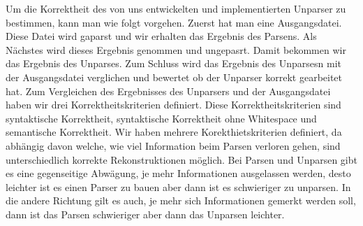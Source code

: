 Um die Korrektheit des von uns entwickelten und implementierten Unparser zu bestimmen, kann man wie folgt vorgehen. Zuerst hat man eine Ausgangsdatei. Diese Datei wird gaparst und wir erhalten das Ergebnis des Parsens. Als Nächstes wird dieses Ergebnis genommen und ungepasrt. Damit bekommen wir das Ergebnis des Unparses. Zum Schluss wird das Ergebnis des Unparsesn mit der Ausgangsdatei verglichen und bewertet ob der Unparser korrekt gearbeitet hat. Zum Vergleichen des Ergebnisses des Unparsers und der Ausgangsdatei haben wir drei Korrektheitskriterien definiert. Diese Korrektheitskriterien sind syntaktische Korrektheit, syntaktische Korrektheit ohne Whitespace und semantische Korrektheit. Wir haben mehrere Korekthietskriterien definiert, da abhängig davon welche, wie viel Information beim Parsen verloren gehen, sind unterschiedlich korrekte Rekonstruktionen möglich. Bei Parsen und Unparsen gibt es eine gegenseitige Abwägung, je mehr Informationen ausgelassen werden, desto leichter ist es einen Parser zu bauen aber dann ist es schwieriger zu unparsen. In die andere Richtung gilt es auch, je mehr sich Informationen gemerkt werden soll, dann ist das Parsen schwieriger aber dann das Unparsen leichter.

 

 
